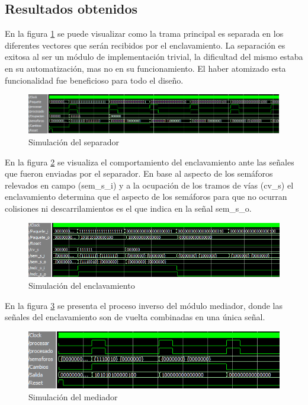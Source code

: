 	\subsection{Resultados obtenidos}
				
		En la figura \ref{fig:Test_Separador} se puede visualizar como la trama principal es separada en los diferentes vectores que serán recibidos por el enclavamiento. La separación es exitosa al ser un módulo de implementación trivial, la dificultad del mismo estaba en su automatización, mas no en su funcionamiento. El haber atomizado esta funcionalidad fue beneficioso para todo el diseño.
		
		\begin{figure}[!hbt]
		\centering
		\includegraphics[scale=0.6]{./Figures/Test/Separador}
			\caption{Simulación del separador}
			\label{fig:Test_Separador}
		\end{figure}
		
		En la figura \ref{fig:Test_Enclavamiento} se visualiza el comportamiento del enclavamiento ante las señales que fueron enviadas por el separador. En base al aspecto de los semáforos relevados en campo (sem\_s\_i) y a la ocupación de los tramos de vías (cv\_s) el enclavamiento determina que el aspecto de los semáforos para que no ocurran colisiones ni descarrilamientos es el que indica en la señal sem\_s\_o.
		
		\begin{figure}[!hbt]
		\centering
		\includegraphics[scale=0.65]{./Figures/Test/Enclavamiento}
			\caption{Simulación del enclavamiento}
			\label{fig:Test_Enclavamiento}
		\end{figure}

		
		En la figura \ref{fig:Test_Mediador} se presenta el proceso inverso del módulo mediador, donde las señales del enclavamiento son de vuelta combinadas en una única señal.
		
		\begin{figure}[!hbt]
		\centering
		\includegraphics[scale=0.8]{./Figures/Test/Mediador}
			\caption{Simulación del mediador}
			\label{fig:Test_Mediador}
		\end{figure}
		
